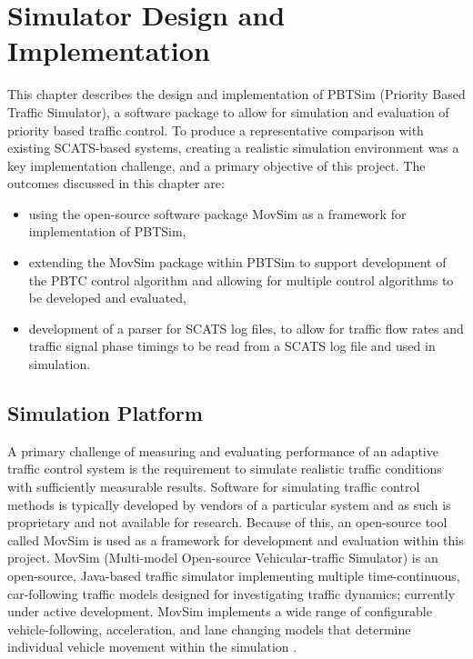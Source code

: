 \chapter{Simulator Design and Implementation}

This chapter describes the design and implementation of PBTSim (Priority Based Traffic Simulator), a software package to allow for simulation and evaluation of priority based traffic control. To produce a representative comparison with existing SCATS-based systems, creating a realistic simulation environment was a key implementation challenge, and a primary objective of this project. The outcomes discussed in this chapter are:

\begin{itemize}
\item using the open-source software package MovSim as a framework for implementation of PBTSim,
\item extending the MovSim package within PBTSim to support development of the PBTC control algorithm and allowing for multiple control algorithms to be developed and evaluated,
\item development of a parser for SCATS log files, to allow for traffic flow rates and traffic signal phase timings to be read from a SCATS log file and used in simulation.
\end{itemize}

\section{Simulation Platform}

A primary challenge of measuring and evaluating performance of an adaptive traffic control system is the requirement to simulate realistic traffic conditions with sufficiently measurable results. Software for simulating traffic control methods is typically developed by vendors of a particular system and as such is proprietary and not available for research. Because of this, an open-source tool called MovSim is used as a framework for development and evaluation within this project. MovSim (Multi-model Open-source Vehicular-traffic Simulator) is an open-source, Java-based traffic simulator implementing multiple time-continuous, car-following traffic models designed for investigating traffic dynamics; currently under active development. MovSim implements a wide range of configurable vehicle-following, acceleration, and lane changing models that determine individual vehicle movement within the simulation \cite{movsim,kesting2013traffic}.

